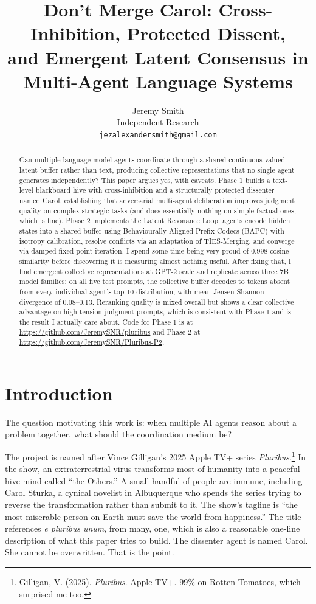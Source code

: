 \documentclass[10pt,twocolumn]{article}
\title{\textbf{Don't Merge Carol: Cross-Inhibition, Protected Dissent,\\
and Emergent Latent Consensus in Multi-Agent Language Systems}}
\author{
Jeremy Smith\\
Independent Research\\
\texttt{jezalexandersmith@gmail.com}
}
\date{}
\begin{document}
\maketitle

\begin{abstract}
Can multiple language model agents coordinate through a shared continuous-valued latent buffer rather than text, producing collective representations that no single agent generates independently? This paper argues yes, with caveats. Phase 1 builds a text-level blackboard hive with cross-inhibition and a structurally protected dissenter named Carol, establishing that adversarial multi-agent deliberation improves judgment quality on complex strategic tasks (and does essentially nothing on simple factual ones, which is fine). Phase 2 implements the Latent Resonance Loop: agents encode hidden states into a shared buffer using Behaviourally-Aligned Prefix Codecs (BAPC) with isotropy calibration, resolve conflicts via an adaptation of TIES-Merging, and converge via damped fixed-point iteration. I spend some time being very proud of 0.998 cosine similarity before discovering it is measuring almost nothing useful. After fixing that, I find emergent collective representations at GPT-2 scale and replicate across three 7B model families: on all five test prompts, the collective buffer decodes to tokens absent from every individual agent's top-10 distribution, with mean Jensen-Shannon divergence of 0.08--0.13. Reranking quality is mixed overall but shows a clear collective advantage on high-tension judgment prompts, which is consistent with Phase 1 and is the result I actually care about. Code for Phase 1 is at \url{https://github.com/JeremySNR/pluribus} and Phase 2 at \url{https://github.com/JeremySNR/Pluribus-P2}.
\end{abstract}

\section{Introduction}

The question motivating this work is: when multiple AI agents reason about a problem together, what should the coordination medium be?

The project is named after Vince Gilligan's 2025 Apple TV+ series \textit{Pluribus}.\footnote{Gilligan, V. (2025). \textit{Pluribus}. Apple TV+. 99\% on Rotten Tomatoes, which surprised me too.} In the show, an extraterrestrial virus transforms most of humanity into a peaceful hive mind called ``the Others.'' A small handful of people are immune, including Carol Sturka, a cynical novelist in Albuquerque who spends the series trying to reverse the transformation rather than submit to it. The show's tagline is ``the most miserable person on Earth must save the world from happiness.'' The title references \textit{e pluribus unum}, from many, one, which is also a reasonable one-line description of what this paper tries to build. The dissenter agent is named Carol. She cannot be overwritten. That is the point.
\end{document}
